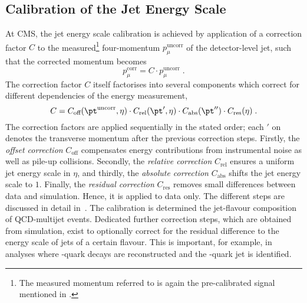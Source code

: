 \subsection{Calibration of the Jet Energy Scale} \label{sec:Jets:JEC:FactorisedApproach}
At CMS, the jet energy scale calibration is achieved by application of a correction factor $C$ to the measured\footnote{The measured momentum referred to is again the pre-calibrated signal mentioned in .} four-momentum $p^{\text{uncorr}}_{\mu}$ of the detector-level jet, such that the corrected momentum becomes
\begin{equation*}
  p^{\text{corr}}_{\mu} = C \cdot p^{\text{uncorr}}_{\mu} \;.
\end{equation*}
The correction factor $C$ itself factorises into several components which correct for different dependencies of the energy measurement,
\begin{equation*}
  C = C_{\text{off}}(\pt^{\text{uncorr}},\eta) \cdot C_{\text{rel}}(\pt',\eta) \cdot C_{\text{abs}}(\pt'') \cdot C_{\text{res}}(\eta) \;.
\end{equation*}
The correction factors are applied sequentially in the stated order; each $'$ on \pt denotes the transverse momentum after the previous correction steps.
Firstly, the \textit{offset correction} $C_{\text{off}}$ compensates energy contributions from instrumental noise as well as pile-up collisions.
Secondly, the \textit{relative correction} $C_{\text{rel}}$ ensures a uniform jet energy scale in $\eta$, and thirdly, the \textit{absolute correction} $C_{\text{abs}}$ shifts the jet energy scale to $1$.
Finally, the \textit{residual correction} $C_{\text{res}}$ removes small differences between data and simulation.
Hence, it is applied to data only.
The different steps are discussed in detail in~\cite{1748-0221-6-11-P11002,CMS-PAS-JME-10-010,CMS-PAS-JME-07-002}.
The calibration is determined \wrt the jet-flavour composition of QCD-multijet events.
Dedicated further correction steps, which are obtained from simulation, exist to optionally correct for the residual difference to the energy scale of jets of a certain flavour.
This is important, for example, in analyses where \qt-quark decays are reconstructed and the \qb-quark jet is identified.

